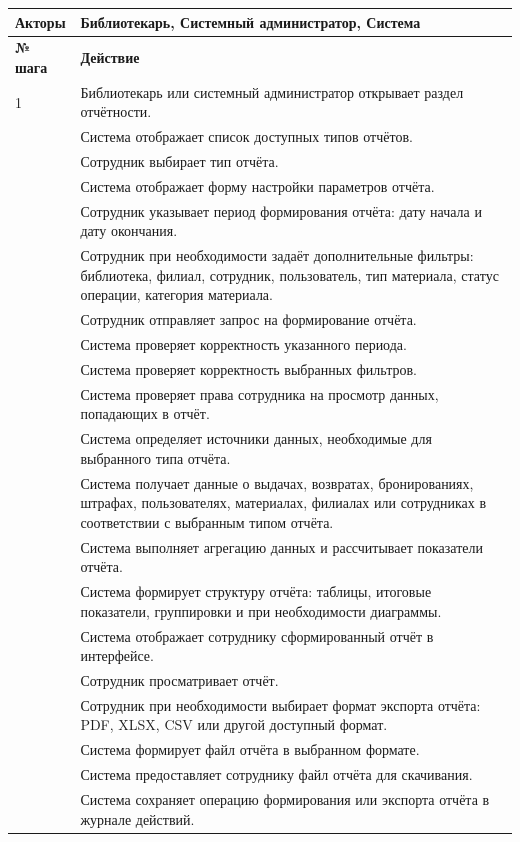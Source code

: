 \documentclass[12pt,a4paper]{article}
\begin{document}
\begin{xltabular}{\textwidth}{
				|>{\raggedright\arraybackslash}p{2.7cm}
				|>{\raggedright\arraybackslash}X|
			}
			\textbf{Акторы} &
			Библиотекарь, Системный администратор, Система \\
			\hline
			
			
			\textbf{№ шага} & \textbf{Действие} \\
			\hline
			
			1 & Библиотекарь или системный администратор открывает раздел
			отчётности. \\
			 & Система отображает список доступных типов отчётов. \\
			 & Сотрудник выбирает тип отчёта. \\
			 & Система отображает форму настройки параметров отчёта. \\
			 & Сотрудник указывает период формирования отчёта: дату начала и дату
			окончания. \\
			 & Сотрудник при необходимости задаёт дополнительные фильтры:
			библиотека, филиал, сотрудник, пользователь, тип материала, статус
			операции, категория материала. \\
			 & Сотрудник отправляет запрос на формирование отчёта. \\
			 & Система проверяет корректность указанного периода. \\
			 & Система проверяет корректность выбранных фильтров. \\
			 & Система проверяет права сотрудника на просмотр данных, попадающих
			в отчёт. \\
			 & Система определяет источники данных, необходимые для выбранного
			типа отчёта. \\
			 & Система получает данные о выдачах, возвратах, бронированиях,
			штрафах, пользователях, материалах, филиалах или сотрудниках в
			соответствии с выбранным типом отчёта. \\
			 & Система выполняет агрегацию данных и рассчитывает показатели
			отчёта. \\
			 & Система формирует структуру отчёта: таблицы, итоговые показатели,
			группировки и при необходимости диаграммы. \\
			 & Система отображает сотруднику сформированный отчёт в интерфейсе. \\
			 & Сотрудник просматривает отчёт. \\
			 & Сотрудник при необходимости выбирает формат экспорта отчёта:
			PDF, XLSX, CSV или другой доступный формат. \\
			 & Система формирует файл отчёта в выбранном формате. \\
			 & Система предоставляет сотруднику файл отчёта для скачивания. \\
			 & Система сохраняет операцию формирования или экспорта отчёта в
			журнале действий. \\
			\hline
			

\end{xltabular}
\end{document}
